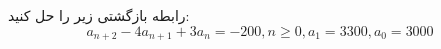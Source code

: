 \EXERCISE
رابطه بازگشتی زیر را حل کنید:
$$a_{n+2} - 4a_{n+1} + 3a_n = -200, n \geq 0, a_1 = 3300, a_0 = 3000$$